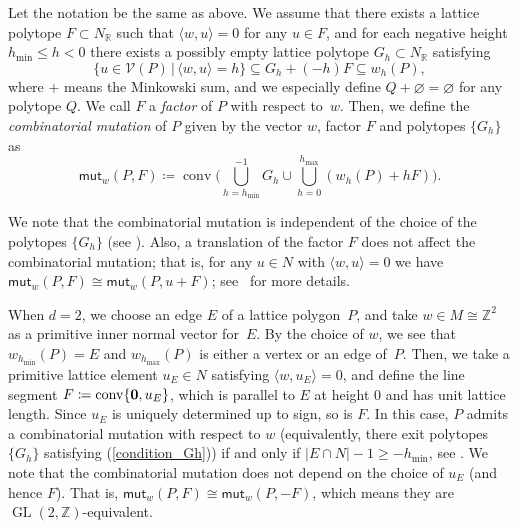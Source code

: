 \documentclass[11pt]{article}
\numberwithin{equation}{section}
\numberwithin{equation}{section}
\numberwithin{figure}{section}
\numberwithin{table}{section}
\newcommand{\ZZ}{\mathbb{Z}}
\newcommand{\RR}{\mathbb{R}}
\newcommand{\calV}{\mathcal{V}}
\newcommand{\GL}{\operatorname{GL}}
\newcommand{\mutation}{\mathsf{mut}}
\begin{document}
\begin{Definition}\label{def_mutation_polygon}
Let the notation be the same as above.
We assume that there exists a lattice polytope $F\subset N_\RR$ such that $\langle w,u\rangle=0$ for any $u\in F$, and
for each negative height $h_{\min}\le h<0$ there exists a possibly empty lattice polytope $G_h\subset N_\RR$ satisfying
\begin{equation}\label{condition_Gh}
\{u\in\calV(P)\,|\, \langle w,u \rangle=h\}\subseteq G_h+(-h)F\subseteq w_h(P),
\end{equation}
where $+$ means the Minkowski sum, and we especially define $Q+\varnothing=\varnothing$ for any polytope $Q$.
We call $F$ a \emph{factor} of $P$ with respect to~$w$.
Then, we define the \emph{combinatorial mutation} of $P$ given by the vector $w$, factor $F$ and polytopes $\{G_h\}$ as
\begin{displaymath}
\mutation_w(P,F)\coloneqq\operatorname{conv}\bigg(\bigcup_{h=h_{\min}}^{-1}G_h\cup\bigcup_{h=0}^{h_{\max}}(w_h(P)+hF)\bigg).
\end{displaymath}
\end{Definition}

We note that the combinatorial mutation is independent of the choice of the polytopes $\{G_h\}$ (see \cite[Proposition~1]{ACGK}).
Also, a translation of the factor $F$ does not affect the combinatorial mutation; that is,
for any $u\in N$ with $\langle w,u\rangle=0$ we have $\mutation_w(P,F)\cong\mutation_w(P,u+F)$; see~\cite{ACGK} for more details.

\begin{Remark}[the combinatorial mutation for the case of $d=2$]\label{rem_def_mutation}
When $d=2$, we choose an edge $E$ of a lattice polygon~$P$, and take $w\in M\cong\ZZ^2$ as a primitive inner normal vector for~$E$.
By the choice of $w$, we see that $w_{h_{\min}}(P)=E$ and $w_{h_{\max}}(P)$ is either a vertex or an edge of~$P$.
Then, we take a primitive lattice element $u_E\in N$ satisfying $\langle w,u_E \rangle=0$, and define the line segment $F\coloneqq\operatorname{conv}\{{\bf 0},u_E\}$,
which is parallel to $E$ at height $0$ and has unit lattice length. Since $u_E$ is uniquely determined up to sign, so is $F$.
In this case, $P$ admits a combinatorial mutation with respect to $w$ (equivalently, there exit polytopes $\{G_h\}$ satisfying (\ref{condition_Gh})) if and only if $|E\cap N|-1\ge -h_{\min}$, see \cite[Lemma~1]{KNP}.
We note that the combinatorial mutation does not depend on the choice of $u_E$ (and hence $F$). That is,
$\mutation_w(P,F)\cong\mutation_w(P,-F)$, which means they are $\GL(2,\ZZ)$-equivalent.
\end{Remark}
\end{document}
